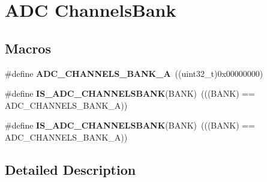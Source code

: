 \hypertarget{group___a_d_c___channels_bank}{\section{A\-D\-C Channels\-Bank}
\label{group___a_d_c___channels_bank}
}
\subsection*{Macros}
\begin{DoxyCompactItemize}
\item 
\hypertarget{group___a_d_c___channels_bank_ga7d9360d905b5db28293f8867159c06b5}{\#define {\bfseries A\-D\-C\-\_\-\-C\-H\-A\-N\-N\-E\-L\-S\-\_\-\-B\-A\-N\-K\-\_\-\-A}~((uint32\-\_\-t)0x00000000)}\label{group___a_d_c___channels_bank_ga7d9360d905b5db28293f8867159c06b5}

\item 
\hypertarget{group___a_d_c___channels_bank_ga9d85dee5b07c8f1c79b6587a7f219344}{\#define {\bfseries I\-S\-\_\-\-A\-D\-C\-\_\-\-C\-H\-A\-N\-N\-E\-L\-S\-B\-A\-N\-K}(B\-A\-N\-K)~(((B\-A\-N\-K) == A\-D\-C\-\_\-\-C\-H\-A\-N\-N\-E\-L\-S\-\_\-\-B\-A\-N\-K\-\_\-\-A))}\label{group___a_d_c___channels_bank_ga9d85dee5b07c8f1c79b6587a7f219344}

\item 
\hypertarget{group___a_d_c___channels_bank_ga9d85dee5b07c8f1c79b6587a7f219344}{\#define {\bfseries I\-S\-\_\-\-A\-D\-C\-\_\-\-C\-H\-A\-N\-N\-E\-L\-S\-B\-A\-N\-K}(B\-A\-N\-K)~(((B\-A\-N\-K) == A\-D\-C\-\_\-\-C\-H\-A\-N\-N\-E\-L\-S\-\_\-\-B\-A\-N\-K\-\_\-\-A))}\label{group___a_d_c___channels_bank_ga9d85dee5b07c8f1c79b6587a7f219344}

\end{DoxyCompactItemize}


\subsection{Detailed Description}

